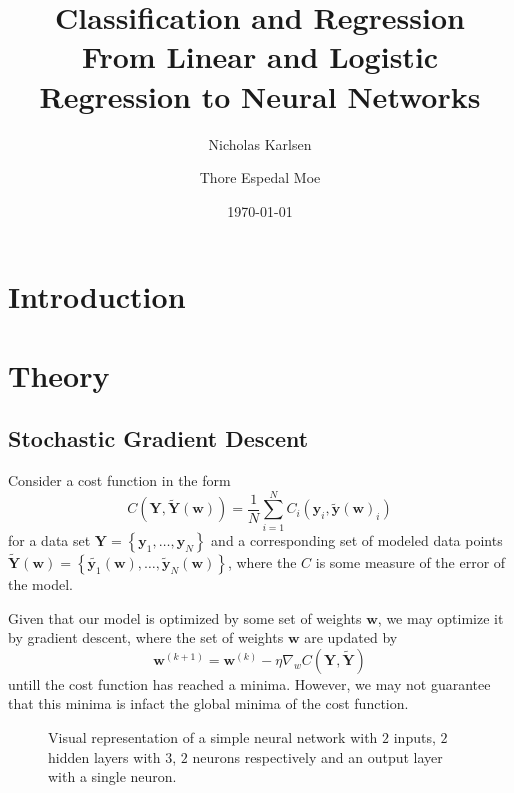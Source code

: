 \documentclass[reprint, english, nofootinbib]{revtex4-2}
\begin{document}
\title{Classification and Regression\\
\normalsize{From Linear and Logistic Regression to Neural Networks}}

\author{Nicholas Karlsen}
\author{Thore Espedal Moe}
\date{\today}

\begin{abstract}
\end{abstract}

\maketitle

\section{Introduction}

\section{Theory}
\subsection{Stochastic Gradient Descent}
\noindent
Consider a cost function in the form
\begin{equation}
    C(\pmb Y, \tilde{\pmb Y}(\pmb w)) = \frac{1}{N}\sum_{i=1}^{N}C_i(\pmb y_i, \tilde{\pmb y}(\pmb w)_i)
\end{equation}
for a data set $\pmb Y = \left\{\pmb y_1, \dots, \pmb y_N\right\}$ and a corresponding set of modeled data points $\tilde{\pmb Y}(\pmb w) = \left\{\tilde{\pmb y_1}(\pmb w), \dots, \tilde{\pmb y}_N(\pmb w)\right\}$, where the $C$ is some measure of the error of the model.

Given that our model is optimized by some set of weights $\pmb w$, we may optimize it by gradient descent, where the set of weights $\pmb w$ are updated by
\begin{equation}
    \pmb w^{(k+1)} = \pmb w^{(k)} - \eta \nabla_{w}C(\pmb Y, \tilde{\pmb Y})
\end{equation}
untill the cost function has reached a minima. However, we may not guarantee that this minima is infact the global minima of the cost function.

\begin{figure}[h!tb]
    \center
    \vspace{5mm} %
    
    \caption{\label{fig: NN Fig} Visual representation of a simple neural network with $2$ inputs, $2$ hidden layers with $3$, $2$ neurons respectively and an output layer with a single neuron.}
\end{figure}
\end{document}
